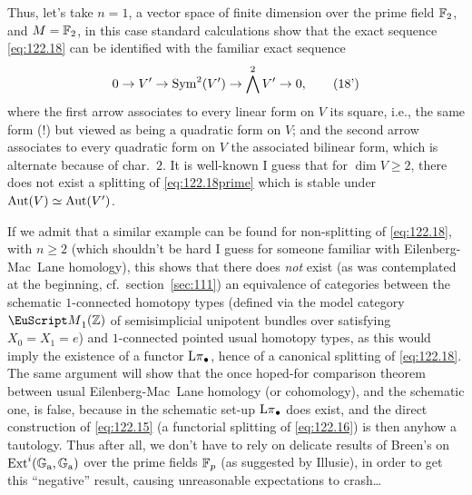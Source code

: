 Thus, let's take $n=1$, a vector space of finite dimension over the
prime field ${\mathbb{F}}_2$, and $M={\mathbb{F}}_2$, in this case standard
calculations show that the exact sequence
\eqref{eq:122.18} can be identified with the familiar exact sequence
\begin{equation}
  \label{eq:122.18prime}
  0\to V'\to \operatorname{Sym}^2(V')\to \bigwedge^2 V'\to 0,\tag{18'}
\end{equation}
where the first arrow associates to every linear form on $V$ its
square, i.e., the same form (!) but viewed as being a quadratic form
on $V$; and the second arrow associates to every quadratic form on $V$
the associated bilinear form, which is alternate because of
char.~$2$. It is well-known I guess that for $\dim V\ge2$, there does
not exist a splitting of \eqref{eq:122.18prime} which is stable under
$\operatorname{Aut}(V)\simeq\operatorname{Aut}(V')$.

\begin{remark}
  If we admit that a similar example can be found for non-splitting of
  \eqref{eq:122.18}, with $n\ge2$ (which shouldn't be hard I guess for
  someone familiar with Eilenberg-Mac~Lane homology), this shows that
  there does \emph{not} exist (as was contemplated at the beginning,
  cf.\ section~\ref{sec:111}) an equivalence of categories between the
  schematic $1$-connected homotopy types (defined via the model
  category $\scrM_1(\bZ)$ of semisimplicial unipotent bundles over
  \bZ{} satisfying $X_0=X_1=e$) and $1$-connected pointed usual
  homotopy types, as this would imply the existence of a functor
  $\operatorname{L\pi}_\bullet$, hence of a canonical splitting of
  \eqref{eq:122.18}. The same argument will show that the once
  hoped-for comparison theorem between usual Eilenberg-Mac~Lane
  homology (or cohomology), and the schematic one, is false, because
  in the schematic set-up $\operatorname{L\pi}_\bullet$ does exist, and the direct
  construction of \eqref{eq:122.15} (a functorial splitting of
  \eqref{eq:122.16}) is then anyhow a tautology. Thus after all, we
  don't have to rely on delicate results of Breen's on
  $\operatorname{Ext}^i({\mathbb{G}}_{\mathrm{a}},{\mathbb{G}}_{\mathrm{a}})$ over the prime fields ${\mathbb{F}}_p$ (as
  suggested by Illusie), in order to get this ``negative'' result,
  causing unreasonable expectations to crash\dots
\end{remark}

\bigbreak

\noindent\hfill{}\par

